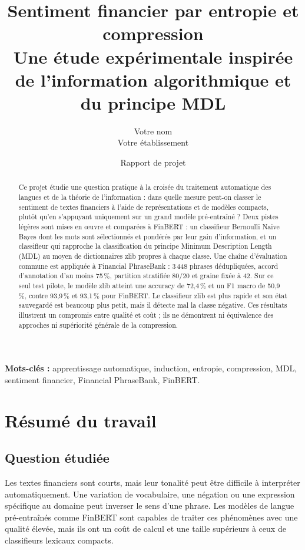 \documentclass[11pt,a4paper]{article}
\title{\vspace{-1.5cm}\color{navy}\Huge Sentiment financier par entropie et compression\\[0.4em]
\Large Une étude expérimentale inspirée de l'information algorithmique et du principe MDL}
\author{Votre nom\\[0.3em]\normalsize Votre établissement}
\date{\normalsize Rapport de projet}
\begin{document}
\maketitle
\thispagestyle{empty}

\begin{abstract}
Ce projet étudie une question pratique à la croisée du traitement automatique
des langues et de la théorie de l'information : dans quelle mesure peut-on
classer le sentiment de textes financiers à l'aide de représentations et de
modèles compacts, plutôt qu'en s'appuyant uniquement sur un grand modèle
pré-entraîné ? Deux pistes légères sont mises en œuvre et comparées à FinBERT :
un classifieur Bernoulli Naive Bayes dont les mots sont sélectionnés et
pondérés par leur gain d'information, et un classifieur qui rapproche la
classification du principe Minimum Description Length (MDL) au moyen de
dictionnaires zlib propres à chaque classe. Une chaîne d'évaluation commune
est appliquée à Financial PhraseBank : 3\,448 phrases dédupliquées, accord
d'annotation d'au moins 75\,\%, partition stratifiée 80/20 et graine fixée à
42. Sur ce seul test pilote, le modèle zlib atteint une accuracy de 72,4\,\%
et un F1 macro de 50,9\,\%, contre 93,9\,\% et 93,1\,\% pour FinBERT. Le
classifieur zlib est plus rapide et son état sauvegardé est beaucoup plus
petit, mais il détecte mal la classe négative. Ces résultats illustrent un
compromis entre qualité et coût ; ils ne démontrent ni équivalence des
approches ni supériorité générale de la compression.
\end{abstract}

\vfill
\textbf{Mots-clés :} apprentissage automatique, induction, entropie,
compression, MDL, sentiment financier, Financial PhraseBank, FinBERT.
\newpage
\tableofcontents
\newpage

\section{Résumé du travail}

\subsection{Question étudiée}
Les textes financiers sont courts, mais leur tonalité peut être difficile à
interpréter automatiquement. Une variation de vocabulaire, une négation ou
une expression spécifique au domaine peut inverser le sens d'une phrase.
Les modèles de langue pré-entraînés comme FinBERT sont capables de traiter
ces phénomènes avec une qualité élevée, mais ils ont un coût de calcul et une
taille supérieurs à ceux de classifieurs lexicaux compacts.
\end{document}
